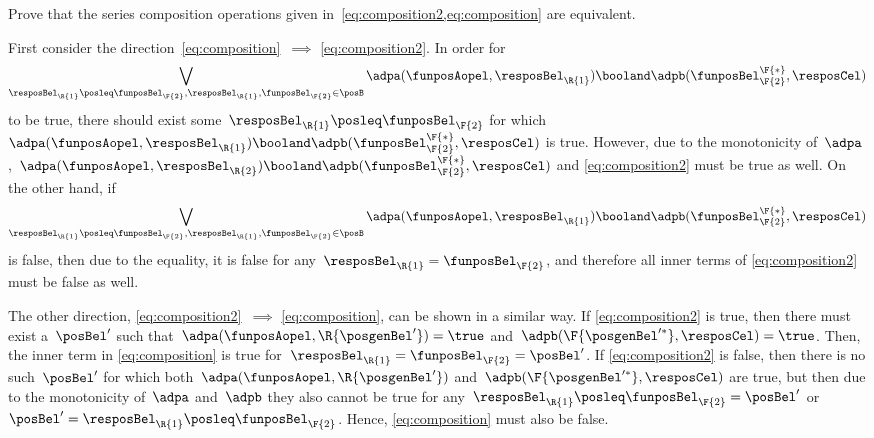 \begin{exercise}
    \label{ex:composition_equivalency}
    Prove that the series composition operations given in~\cref{eq:composition2,eq:composition} are equivalent.
\end{exercise}
%
\begin{solution}
    First consider the direction~\cref{eq:composition}~$\implies$ \cref{eq:composition2}.
    In order for%
    \begin{equation*}
        \bigvee_{\resposBel_\R{1}\posleq\funposBel_\F{2}, \resposBel_\R{1},\funposBel_\F{2}\in \posB} \adpa(\funposAopel,\resposBel_\R{1}) \booland \adpb(\funposBel_\F{2}^\F{*},\resposCel)%
    \end{equation*}
    to be true, there should exist some~$\resposBel_\R{1}\posleq \funposBel_\F{2}$ for which~$\adpa(\funposAopel,\resposBel_\R{1}) \booland\adpb(\funposBel_\F{2}^\F{*},\resposCel)$ is true.
    However, due to the monotonicity of~$\adpa$,~$\adpa(\funposAopel,\resposBel_\R{2}) \booland \adpb(\funposBel_\F{2}^\F{*},\resposCel)$ and \cref{eq:composition2} must be true as well.
    On the other hand, if%
    \begin{equation*}
        \bigvee_{\resposBel_\R{1}\posleq\funposBel_\F{2}, \resposBel_\R{1},\funposBel_\F{2}\in \posB} \adpa(\funposAopel,\resposBel_\R{1}) \booland \adpb(\funposBel_\F{2}^\F{*},\resposCel)%
    \end{equation*}
    is false, then due to the equality, it is false for any~$\resposBel_\R{1}=\funposBel_\F{2}$, and therefore all inner terms of \cref{eq:composition2} must be false as well.

    The other direction, \cref{eq:composition2}~$\implies$ \cref{eq:composition}, can be shown in a similar way.
    If \cref{eq:composition2} is true, then there must exist a~$\posBel'$ such that~$\adpa(\funposAopel, \R{\posgenBel'})=\true$ and~$\adpb(\F{\posgenBel'^*}, \resposCel)=\true$.
    Then, the inner term in \cref{eq:composition} is true for~$\resposBel_\R{1}=\funposBel_\F{2}=\posBel'$.
    If \cref{eq:composition2} is false, then there is no such~$\posBel'$ for which both~$\adpa(\funposAopel, \R{\posgenBel'})$ and~$\adpb(\F{\posgenBel'^*}, \resposCel)$ are true, but then due to the monotonicity of~$\adpa$ and~$\adpb$ they also cannot be true for any~$\resposBel_\R{1} \posleq \funposBel_\F{2} = \posBel'$ or~$\posBel'=\resposBel_\R{1} \posleq \funposBel_\F{2}$.
    Hence, \cref{eq:composition} must also be false.
\end{solution}

